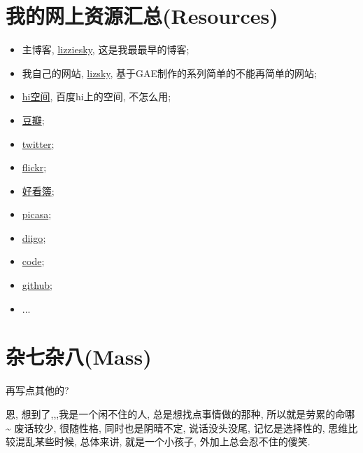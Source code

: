 \documentclass[letterpaper,10pt,english]{manual}
\begin{document}
\section{我的网上资源汇总(Resources)}
\begin{itemize}
\item {} 
主博客, \href{http://lizziesky.blogspot.com}{lizziesky}, 这是我最最早的博客;

\item {} 
我自己的网站, \href{http://liz.appspot.com}{lizsky}, 基于GAE制作的系列简单的不能再简单的网站;

\item {} 
\href{http://hi.baidu.com/lizziesky}{hi空间}, 百度hi上的空间, 不怎么用;

\item {} 
\href{http://www.douban.com/people/lizziesky/}{豆瓣};

\item {} 
\href{http://twitter.com/lizziesky}{twitter};

\item {} 
\href{http://www.flickr.com/photos/26211501@N07/}{flickr};

\item {} 
\href{http://lizziesky.haokanbu.com/}{好看簿};

\item {} 
\href{http://picasaweb.google.com/lizziesPicture}{picasa};

\item {} 
\href{http://www.diigo.com/dashboard/shengyan}{diigo};

\item {} 
\href{http://code.google.com/u/shengyan1985/}{code};

\item {} 
\href{https://github.com/lizzie}{github};

\item {} 
...

\end{itemize}


\section{杂七杂八(Mass)}

再写点其他的?

恩, 想到了,,,我是一个闲不住的人, 总是想找点事情做的那种, 所以就是劳累的命哪\textasciitilde{}
废话较少, 很随性格, 同时也是阴晴不定, 说话没头没尾, 记忆是选择性的, 思维比较混乱某些时候, 总体来讲, 就是一个小孩子, 外加上总会忍不住的傻笑.
\end{document}
